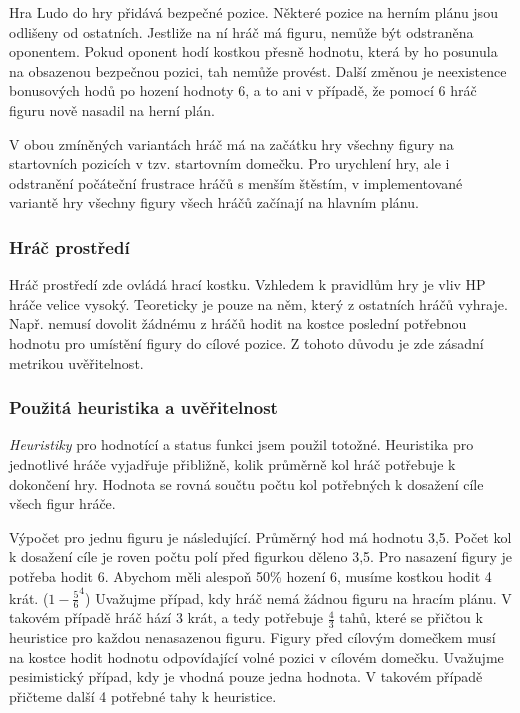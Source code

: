 Hra Ludo do hry přidává bezpečné pozice. Některé pozice na herním plánu jsou odlišeny od ostatních. Jestliže na ní hráč má figuru, nemůže být odstraněna oponentem. Pokud oponent hodí kostkou přesně hodnotu, která by ho posunula na obsazenou bezpečnou pozici, tah nemůže provést. Další změnou je neexistence bonusových hodů po hození hodnoty 6, a to ani v případě, že pomocí 6 hráč figuru nově nasadil na herní plán.

V obou zmíněných variantách hráč má na začátku hry všechny figury na startovních pozicích v tzv. startovním domečku. Pro urychlení hry, ale i odstranění počáteční frustrace hráčů s menším štěstím, v implementované variantě hry všechny figury všech hráčů začínají na hlavním plánu.

\subsubsection{Hráč prostředí}

Hráč prostředí zde ovládá hrací kostku. Vzhledem k pravidlům hry je vliv HP hráče velice vysoký. Teoreticky je pouze na něm, který z ostatních hráčů vyhraje. Např. nemusí dovolit žádnému z hráčů hodit na kostce poslední potřebnou hodnotu pro umístění figury do cílové pozice. Z tohoto důvodu je zde zásadní metrikou uvěřitelnost.

\subsubsection{Použitá heuristika a uvěřitelnost}

\emph{Heuristiky} pro hodnotící a status funkci jsem použil totožné. Heuristika pro jednotlivé hráče vyjadřuje přibližně, kolik průměrně kol hráč potřebuje k dokončení hry. Hodnota se rovná součtu počtu kol potřebných k dosažení cíle všech figur hráče. 

Výpočet pro jednu figuru je následující. Průměrný hod má hodnotu 3,5. Počet kol k dosažení cíle je roven počtu polí před figurkou děleno 3,5. Pro nasazení figury je potřeba hodit 6. Abychom měli alespoň 50\% hození 6, musíme kostkou hodit 4 krát. ($1-\frac{5}{6}^4$) Uvažujme případ, kdy hráč nemá žádnou figuru na hracím plánu. V takovém případě hráč hází 3 krát, a tedy potřebuje $\frac{4}{3}$ tahů, které se přičtou k heuristice pro každou nenasazenou figuru. Figury před cílovým domečkem musí na kostce hodit hodnotu odpovídající volné pozici v cílovém domečku. Uvažujme pesimistický případ, kdy je vhodná pouze jedna hodnota. V takovém případě přičteme další 4 potřebné tahy k heuristice.

